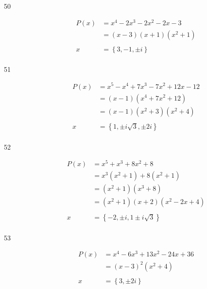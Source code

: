 \documentclass{exam}
\begin{document}
\begin{description}
      \item[50]
        \begin{align*}
          P(x) &= x^4 - 2x^3 - 2x^2 - 2x - 3 \\
               &= (x-3) (x+1) \left( x^2 + 1 \right) \\
               \\
          x    &= \boxed{\left\{ 3, -1, \pm i \right\}} \\
        \end{align*}

      \item[51]
        \begin{align*}
          P(x) &= x^5 - x^4 + 7x^3 - 7x^2 + 12x - 12 \\
               &= (x - 1) \left( x^4 + 7x^2 + 12 \right) \\
               &= (x - 1) \left(x^2 + 3\right) \left(x^2 + 4\right) \\
               \\
          x    &= \boxed{\left\{ 1, \pm i \sqrt{3}, \pm 2i \right\}} \\
        \end{align*}

      \item[52]
        \begin{align*}
          P(x) &= x^5 + x^3 + 8x^2 + 8 \\
               &= x^3(x^2 + 1) + 8(x^2 + 1) \\
               &= \left( x^2 + 1 \right)\left( x^3 + 8 \right) \\
               &=  \left(x^2 + 1\right) (x + 2) \left(x^2 - 2x + 4\right) \\
               \\
          x    &= \boxed{\left\{ -2, \pm i, 1 \pm i \sqrt{3} \right\}} \\
        \end{align*}

      \item[53]
        \begin{align*}
          P(x) &= x^4 - 6x^3 + 13x^2 - 24x + 36 \\
               &= (x - 3)^2 \left(x^2 + 4\right) \\
               \\
          x    &= \boxed{\left\{ 3, \pm 2i \right\}} \\
        \end{align*}


\end{description}
\end{document}
